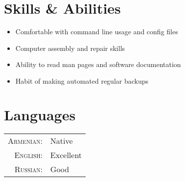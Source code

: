 \documentclass[a4paper,10pt]{article}
\begin{document}
\section{Skills \& Abilities}
\begin{itemize}
\item Comfortable with command line usage and config files
\item Computer assembly and repair skills
\item Ability to read man pages and software documentation
\item Habit of making automated regular backups
\end{itemize}

\section{Languages}
\begin{tabular}{r l}
\textsc{Armenian}: & Native\\
\textsc{English}: & Excellent\\
\textsc{Russian}: & Good
\end{tabular}

\end{document}
